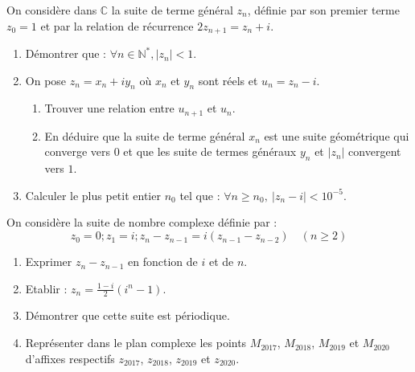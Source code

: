 %
\begin{exo}
      On consid\`ere dans $\mathbb{C}$ la suite de terme g\'en\'eral $z_n$, 
      d\'efinie par son premier terme $z_0 = 1$ et par la relation de r\'ecurrence $2z_{n+1} = z_n + i$.
      \begin{enumerate}
            \item D\'emontrer que : $\forall n \in\mathbb{N}^*, |z_n|<1$.
            \item On pose $z_n = x_n + i y_n$ o\`u $x_n$ et $y_n$ sont r\'eels et $u_n = z_n - i$.
                  \begin{enumerate}
                        \item Trouver une relation entre $u_{n+1}$ et $u_n$.
                        \item En d\'eduire que la suite de terme g\'en\'eral 
                              $x_n$ est une suite g\'eom\'etrique qui converge vers $0$ 
                              et que les suite de termes g\'en\'eraux $y_n$ et $|z_n|$ convergent vers $1$.                  
                  \end{enumerate}
            \item Calculer le plus petit entier $n_0$ tel que : $\forall n \geq n_0,\ |z_n - i| < 10^{-5}$.
      \end{enumerate}
\end{exo}
%
\begin{exo}
      On consid\`ere la suite de nombre complexe d\'efinie par : 
            \[
                  z_0 = 0 ; z_1 = i ; z_n - z_{n-1} = i (z_{n-1} - z_{n-2} ) \quad (n\geq 2)
            \]
      \begin{enumerate}
            \item Exprimer $z_n - z_{n-1}$ en fonction de $i$ et de $n$.
            \item Etablir : $z_n = \frac{1-i}{2} (i^n - 1)$.
            \item D\'emontrer que cette suite est p\'eriodique.
            \item Repr\'esenter dans le plan complexe les points $M_{2017}$, $M_{2018}$, $M_{2019}$ et $M_{2020}$ 
                  d'affixes respectifs  $z_{2017}$, $z_{2018}$, $z_{2019}$ et $z_{2020}$.
      \end{enumerate}
\end{exo}
%
